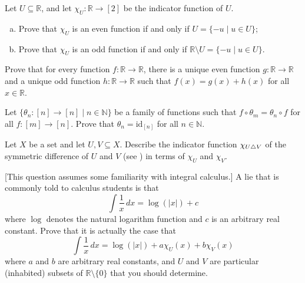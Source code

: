 \begin{chapex}
Let $U \subseteq \mathbb{R}$, and let $\chi_U : \mathbb{R} \to [2]$ be the indicator function of $U$.
\begin{enumerate}[(a)]
\item Prove that $\chi_U$ is an even function if and only if $U = \{ -u \mid u \in U \}$;
\item Prove that $\chi_U$ is an odd function if and only if $\mathbb{R} \setminus U = \{ -u \mid u \in U \}$.
\end{enumerate}
\end{chapex}

\begin{chapex}
Prove that for every function $f : \mathbb{R} \to \mathbb{R}$, there is a unique even function $g : \mathbb{R} \to \mathbb{R}$ and a unique odd function $h : \mathbb{R} \to \mathbb{R}$ such that $f(x)=g(x)+h(x)$ for all $x \in \mathbb{R}$.
\end{chapex}

\begin{chapex}
Let $\{ \theta_n : [n] \to [n] \mid n \in \mathbb{N} \}$ be a family of functions such that $f \circ \theta_m = \theta_n \circ f$ for all $f : [m] \to [n]$. Prove that $\theta_n = \mathrm{id}_{[n]}$ for all $n \in \mathbb{N}$.
\end{chapex}

\begin{chapex}
Let $X$ be a set and let $U, V \subseteq X$. Describe the indicator function $\chi_{U \mathbin{\triangle} V}$ of the symmetric difference of $U$ and $V$ (see ) in terms of $\chi_U$ and $\chi_V$.
\end{chapex}

\begin{chapex}
\label{cqAntiderivativeOfLogarithm}
[This question assumes some familiarity with 
integral calculus.] A lie that is commonly told to calculus students is that
\[ \int \dfrac{1}{x} \, dx = \log(|x|) + c \]
where $\log$ denotes the natural logarithm function and $c$ is an arbitrary real constant. Prove that it is actually the case that
\[ \int \dfrac{1}{x} \, dx = \log(|x|) + a \chi_U(x) + b \chi_V(x) \]
where $a$ and $b$ are arbitrary real constants, and $U$ and $V$ are particular (inhabited) subsets of $\mathbb{R} \setminus \{ 0 \}$ that you should determine.
\end{chapex}

